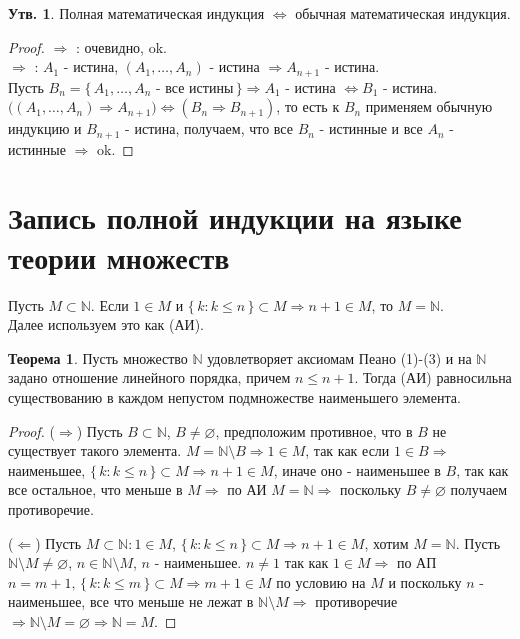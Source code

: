 \documentclass[12pt]{article}
\theoremstyle{definition}
\newtheorem{prop}{Утв.}
\newtheorem{theorem}{Теорема}
\begin{document}
\begin{prop}
	Полная математическая индукция $\Leftrightarrow$ обычная математическая индукция.
\end{prop}
\begin{proof}
	 $\Rightarrow$ : очевидно, ok.\\
	 $\Rightarrow$ : $A_1$ - истина, $(A_1, \dotsc, A_n)$ - истина $\Rightarrow A_{n+1}$ - истина.\\ 
	Пусть $B_n = \{\, A_1, \dotsc, A_n$ - все истины$\,\} \Rightarrow A_1$ - истина $\Leftrightarrow B_1$ - истина.\\
	$\big( (A_1, \dotsc, A_n) \Rightarrow A_{n+1}  \big) \Leftrightarrow (B_n \Rightarrow B_{n+1})$, то есть к $B_n$ применяем обычную индукцию и $B_{n+1}$ - истина, получаем, что все $B_n$ - истинные и все $A_n$ - истинные $\Rightarrow$ ok.
\end{proof}

\section*{Запись полной индукции на языке теории множеств}
Пусть $M \subset \mathbb{N}$. Если $1 \in M$ и $\{\, k \colon k \leq n \,\} \subset M \Rightarrow n+1 \in M$, то $M = \mathbb{N}$.\\ 
Далее используем это как  (АИ).

\begin{theorem}
	Пусть множество $\mathbb{N}$ удовлетворяет аксиомам Пеано (1)-(3) и на $\mathbb{N}$ задано отношение линейного порядка, причем $n \leq n+1$. Тогда (АИ) равносильна существованию в каждом непустом подмножестве наименьшего элемента.
\end{theorem}

\begin{proof}
	($\Rightarrow$)  Пусть $B \subset \mathbb{N}$, $B \neq \varnothing$, предположим противное, что в $B$ не существует такого элемента. $M = \mathbb{N} \setminus B \Rightarrow 1 \in M$, так как если $1 \in B \Rightarrow$ наименьшее, $\{\, k \colon k \leq n\,\} \subset M \Rightarrow n + 1 \in M$, иначе оно - наименьшее в $B$, так как все остальное, что меньше в $M \Rightarrow$ по АИ $M = \mathbb{N} \Rightarrow$ поскольку $B \neq \varnothing$ получаем противоречие.
	
	($\Leftarrow$) Пусть $M \subset \mathbb{N}\colon 1\in M$, $\{\, k \colon k \leq n \,\} \subset M \Rightarrow n+1 \in M$, хотим $M = \mathbb{N}$. Пусть $\mathbb{N}\setminus M \neq \varnothing$, $n \in \mathbb{N}\setminus M$, $n$ - наименьшее. $n \neq 1$ так как $1 \in M \Rightarrow$ по АП $n = m+1,\, \{\, k \colon k \leq m \,\} \subset M \Rightarrow m + 1\in M$ по условию на $M$ и поскольку $n$ - наименьшее, все что меньше не лежат в $\mathbb{N} \setminus M \Rightarrow$ противоречие $\Rightarrow \mathbb{N} \setminus M = \varnothing \Rightarrow \mathbb{N} = M$.
\end{proof}
\end{document}
